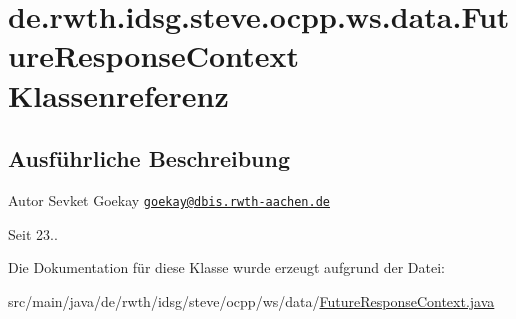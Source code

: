 \hypertarget{classde_1_1rwth_1_1idsg_1_1steve_1_1ocpp_1_1ws_1_1data_1_1_future_response_context}{\section{de.\-rwth.\-idsg.\-steve.\-ocpp.\-ws.\-data.\-Future\-Response\-Context Klassenreferenz}
\label{classde_1_1rwth_1_1idsg_1_1steve_1_1ocpp_1_1ws_1_1data_1_1_future_response_context}
}


\subsection{Ausführliche Beschreibung}
\begin{DoxyAuthor}{Autor}
Sevket Goekay \href{mailto:goekay@dbis.rwth-aachen.de}{\tt goekay@dbis.\-rwth-\/aachen.\-de} 
\end{DoxyAuthor}
\begin{DoxySince}{Seit}
23.. 
\end{DoxySince}


Die Dokumentation für diese Klasse wurde erzeugt aufgrund der Datei\-:\begin{DoxyCompactItemize}
\item 
src/main/java/de/rwth/idsg/steve/ocpp/ws/data/\hyperlink{_future_response_context_8java}{Future\-Response\-Context.\-java}\end{DoxyCompactItemize}
